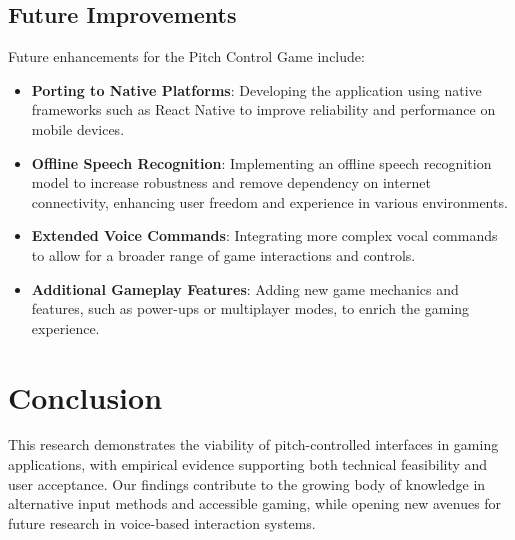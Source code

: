 \documentclass[runningheads]{llncs}
\begin{document}
\subsection{Future Improvements}
Future enhancements for the Pitch Control Game include:
\begin{itemize}
    \item \textbf{Porting to Native Platforms}: Developing the application using native frameworks such as React Native to improve reliability and performance on mobile devices.
    \item \textbf{Offline Speech Recognition}: Implementing an offline speech recognition model to increase robustness and remove dependency on internet connectivity, enhancing user freedom and experience in various environments.
    \item \textbf{Extended Voice Commands}: Integrating more complex vocal commands to allow for a broader range of game interactions and controls.
    \item \textbf{Additional Gameplay Features}: Adding new game mechanics and features, such as power-ups or multiplayer modes, to enrich the gaming experience.
\end{itemize}

\section{Conclusion}
This research demonstrates the viability of pitch-controlled interfaces in gaming applications, with empirical evidence supporting both technical feasibility and user acceptance. Our findings contribute to the growing body of knowledge in alternative input methods and accessible gaming, while opening new avenues for future research in voice-based interaction systems.



\end{document}

